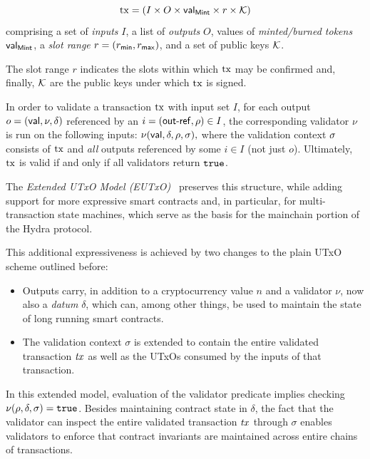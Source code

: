 \begin{definition}[Transactions]
$$
\mathrm{tx} = (I \times O \times \mathsf{val}_\mathsf{Mint} \times r \times \mathcal K)
$$ 
comprising a set of
\emph{inputs} $I$, a list of \emph{outputs} $O$, values of
\emph{minted/burned tokens} $\mathsf{val}_\mathsf{Mint}$, a \emph{slot range}
\(r = (r_{\mathsf{min}}, r_{\mathsf{max}})\), and a set of public keys $\mathcal K$.

The slot range $r$ indicates the slots within which $\mathrm{tx}$ may be
confirmed and, finally, $\mathcal K$ are the public keys under which
$\mathrm{tx}$ is signed.

In order to validate a transaction $\mathrm{tx}$ with input set $I$, for each
output $o = (\mathsf{val},\nu,\delta)$ referenced by an
$i = (\mathsf{out\textsf{-}{}ref},\rho) \in I$, the corresponding validator $\nu$ is run
on the following inputs:
\(
  \nu(\mathsf{val},\delta,\rho,\sigma),
\)
where the validation context $\sigma$ consists of $\mathrm{tx}$ and \emph{all} outputs
referenced by some $i \in I$ (not just $o$). Ultimately, $\mathrm{tx}$ is
valid if and only if all validators return $\mathtt{true}$.
\end{definition}

\vspace{5mm} The \emph{Extended UTxO Model (EUTxO)}~\cite{eutxo} preserves this structure, while adding support for more expressive smart contracts and, in particular, for multi-transaction state machines, which serve as the basis for the mainchain portion of the Hydra protocol. 

This additional expressiveness is achieved by two changes to the plain UTxO scheme outlined before: 

\begin{itemize}
\item Outputs carry, in addition to a cryptocurrency value $n$ and a validator $\nu$, now also a \emph{datum} $\delta$, which can, among other things, be used to maintain the state of long running smart contracts.
\item The validation context $\sigma$ is extended to contain the entire validated transaction $\mathit{tx}$ as well as the UTxOs consumed by the inputs of that transaction.
\end{itemize}

In this extended model, evaluation of the validator predicate implies checking \(\nu(\rho, \delta, \sigma) = \mathtt{true}\). Besides maintaining contract state in $\delta$, the fact that the validator can inspect the entire validated transaction $\mathit{tx}$ through $\sigma$ enables validators to enforce that contract invariants are maintained across entire chains of transactions.

